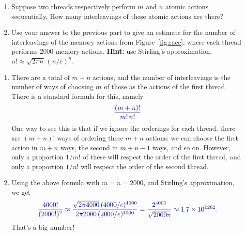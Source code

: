 \begin{questionS}
\begin{enumerate}
\item
Suppose two threads respectively perform $m$ and $n$ atomic actions
sequentially. How many interleavings of these atomic actions are there?

\item Use your answer to the previous part to give an estimate for the number of
  interleavings of the memory actions from Figure~\ref{fig:race}, where each
  thread performs 2000 memory actions.  \textbf{Hint:} use Stirling's
  approximation, $n! \approx \sqrt{2\pi n} \, (n/e)^n$. 
\end{enumerate}
\end{questionS}



\begin{answerS}
\begin{enumerate}
\item There are a total of $m+n$ actions, and the number of interleavings is
  the number of ways of choosing $m$ of those as the actions of the first
  thread.  There is a standard formula for this, namely
  \[\mstyle
  \frac{(m+n)!}{m! \, n!}
  \]
One way to see this is that if we ignore the orderings for each thread, there
are $(m+n)!$ ways of ordering these $m+n$ actions: we can choose the first
action in $m+n$ ways, the second in $m+n-1$ ways, and so on.  However, only a
proportion $1/m!$ of these will respect the order of the first thread, and
only a proportion $1/n!$ will respect the order of the second thread. 


\item
Using the above formula with $m = n = 2000$, and Stirling's approximation, we
get 
\[\mstyle
\frac{4000!}{(2000!)^2}
\approx \frac{\sqrt{2 \pi 4000} \, (4000/e)^{4000}}{
  2 \pi 2000 \, (2000/e)^{4000}}
= \frac{2^{4000}}{\sqrt{2000 \pi}}
\approx 1.7 \times 10^{1202}.
\]
That's a big number!
\end{enumerate}
\end{answerS}
